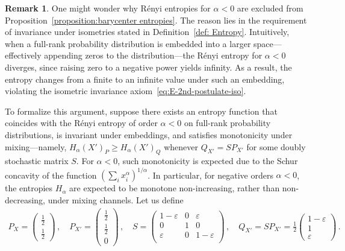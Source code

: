 \documentclass[aps,pra,11pt,onecolumn,nofootinbib,tightenlines]{revtex4-2}
\theoremstyle{definition}
\newtheorem{remark}[theorem]{Remark}
\begin{document}
\begin{remark}
\label{remark: negative alpha dilemma}
  One might wonder why Rényi entropies for $\alpha < 0$ are excluded from Proposition~\ref{proposition:barycenter entropies}. The reason lies in the requirement of invariance under isometries stated in Definition~\ref{def: Entropy}. Intuitively, when a full-rank probability distribution is embedded into a larger space—effectively appending zeros to the distribution—the Rényi entropy for $\alpha < 0$ diverges, since raising zero to a negative power yields infinity. As a result, the entropy changes from a finite to an infinite value under such an embedding, violating the isometric invariance axiom~\ref{eq:E-2nd-postulate-iso}.

To formalize this argument, suppose there exists an entropy function that coincides with the Rényi entropy of order $\alpha < 0$ on full-rank probability distributions, is invariant under embeddings, and satisfies monotonicity under mixing—namely, $H_\alpha(X')_P \geq H_\alpha(X')_Q$ whenever $Q_{X'} = S P_{X'}$ for some doubly stochastic matrix $S$. For $\alpha < 0$, such monotonicity is expected due to the Schur concavity of the function $\left( \sum_i x_i^\alpha \right)^{1/\alpha}$. In particular, for negative orders $\alpha<0$, the entropies $H_\alpha$ are expected to be monotone non-increasing, rather than non-decreasing, under mixing channels.
 Let us define
    \begin{align}
    P_X=\begin{pmatrix}
        \frac{1}{2} \\
        \frac{1}{2}
    \end{pmatrix} \,, \quad
    P_{X'}=\begin{pmatrix}
        \frac{1}{2} \\
        \frac{1}{2}  \\
        0
    \end{pmatrix}
\,,\quad S=\begin{pmatrix}
            1-\varepsilon & 0 & \varepsilon \\
            0& 1 & 0\\
            \varepsilon & 0 & 1-\varepsilon \\
        \end{pmatrix} \,, \quad
       Q_{X'} = SP_{X'} = \frac{1}{2}
       \begin{pmatrix}
           1-\varepsilon\\
           1\\
           \varepsilon
       \end{pmatrix} \,.

\end{align}
\end{remark}
\end{document}
